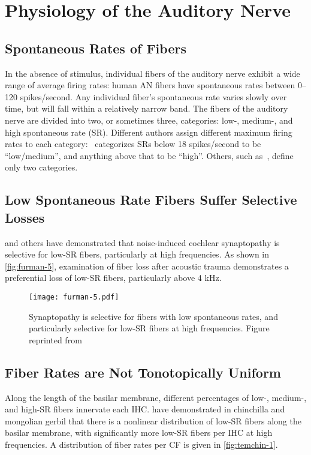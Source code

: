 \section{Physiology of the Auditory Nerve} %
\label{sec:physiology_of_the_auditory_nerve}
\subsection{Spontaneous Rates of Fibers} %
\label{sub:spontaneous_rates_of_fibers}
In the absence of stimulus, individual fibers of the auditory nerve exhibit a wide range of average firing rates: human AN fibers have spontaneous rates between 0--120 spikes/second.  Any individual fiber's spontaneous rate varies slowly over time, but will fall within a relatively narrow band.  The fibers of the auditory nerve are divided into two, or sometimes three, categories: low-, medium-, and high spontaneous rate (SR).  Different authors assign different maximum firing rates to each category:~\cite{Temchin2008Threshold} categorizes SRs below 18 spikes/second to be ``low/medium'', and anything above that to be ``high''.  Others, such as~\cite{Liberman1978AuditoryNerve}, define only two categories.  
\subsection{Low Spontaneous Rate Fibers Suffer Selective Losses} %
\label{sub:low_spontaneous_rate_fibers_suffer_selective_losses}
\cite{Furman2013NoiseInduced} and others have demonstrated that noise-induced cochlear synaptopathy is selective for low-SR fibers, particularly at high frequencies.  As shown in \autoref{fig:furman-5}, examination of fiber loss after acoustic trauma demonstrates a preferential loss of low-SR fibers, particularly above 4 kHz.  

\begin{figure}[htbp]
	\centering
	\texttt{[image: furman-5.pdf]}
	\caption[Synaptopathy is Selective]{Synaptopathy is selective for fibers with low spontaneous rates, and particularly selective for low-SR fibers at high frequencies. Figure reprinted from~\cite{Furman2013NoiseInduced}}
	\label{fig:furman-5}
\end{figure}

\subsection{Fiber Rates are Not Tonotopically Uniform} %
\label{sub:fiber_rates_are_tonotopically_nonuniform}
Along the length of the basilar membrane, different percentages of low-, medium-, and high-SR fibers innervate each IHC.  \cite{Temchin2008Threshold,Temchin2014Spatial,Bourien2014Contribution} have demonstrated in chinchilla and mongolian gerbil that there is a nonlinear distribution of low-SR fibers along the basilar membrane, with significantly more low-SR fibers per IHC at high frequencies.   A distribution of fiber rates per CF is given in \autoref{fig:temchin-1}.

